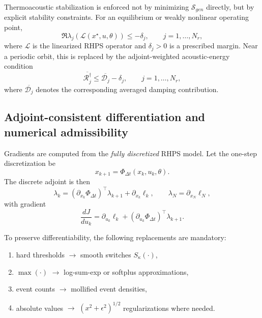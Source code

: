 Thermoacoustic stabilization is enforced not by minimizing
$\mathcal{S}_{gen}$ directly, but by explicit stability constraints.
For an equilibrium or weakly nonlinear operating point,
\begin{equation}
\Re\lambda_j\!\left(\mathcal{L}(x^\star,u,\theta)\right)\le -\delta_j,
\qquad
j=1,\dots,N_r,
\label{eq:stability_constraint_linear}
\end{equation}
where $\mathcal{L}$ is the linearized RHPS operator and $\delta_j>0$ is a prescribed margin.
Near a periodic orbit, this is replaced by the adjoint-weighted acoustic-energy condition
\begin{equation}
\overline{\mathcal{R}_j^\dagger}
\le
\overline{\mathcal{D}_j}
-\delta_j,
\qquad
j=1,\dots,N_r,
\label{eq:stability_constraint_periodic}
\end{equation}
where $\overline{\mathcal{D}_j}$ denotes the corresponding averaged damping contribution.

\subsection{Adjoint-consistent differentiation and numerical admissibility}
\label{subsec:adjoint_admissibility}

Gradients are computed from the \emph{fully discretized} RHPS model.
Let the one-step discretization be
\begin{equation}
x_{k+1}=\Phi_{\Delta t}(x_k,u_k,\theta).
\label{eq:discrete_map}
\end{equation}
The discrete adjoint is then
\begin{equation}
\lambda_k
=
\left(\partial_{x_k}\Phi_{\Delta t}\right)^\top \lambda_{k+1}
+
\partial_{x_k}\ell_k,
\qquad
\lambda_N=\partial_{x_N}\ell_N,
\label{eq:discrete_adjoint}
\end{equation}
with gradient
\begin{equation}
\frac{dJ}{du_k}
=
\partial_{u_k}\ell_k
+
\left(\partial_{u_k}\Phi_{\Delta t}\right)^\top \lambda_{k+1}.
\label{eq:discrete_gradient}
\end{equation}

To preserve differentiability, the following replacements are mandatory:
\begin{enumerate}
\item hard thresholds $\rightarrow$ smooth switches $S_\kappa(\cdot)$,
\item $\max(\cdot)$ $\rightarrow$ log-sum-exp or softplus approximations,
\item event counts $\rightarrow$ mollified event densities,
\item absolute values $\rightarrow$ $(x^2+\epsilon^2)^{1/2}$ regularizations where needed.
\end{enumerate}

